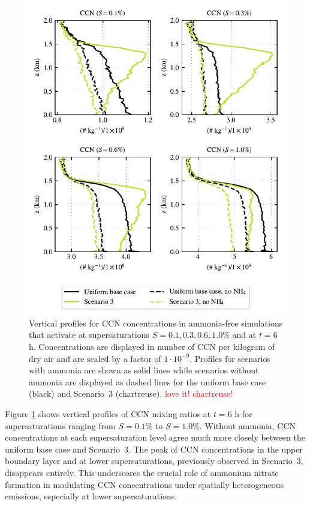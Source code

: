 \documentclass[journal abbreviation, manuscript]{copernicus}
\begin{document}
\begin{figure}[!h]
	\centering
	\includegraphics[]{figures/aerosol-ccn-vertical-profiles-no-nh4-cases-time36.pdf}
	\caption{Vertical profiles for CCN concentrations in
          ammonia-free simulations that activate at supersaturations
          $S=0.1, 0.3, 0.6, 1.0\%$ and at $t=6$ h. Concentrations are
          displayed in number of CCN per kilogram of dry air and are
          scaled by a factor of $1\cdot10^{-9}$. Profiles for
          scenarios with ammonia are shown as solid lines while
          scenarios without ammonia are displayed as dashed lines for
          the uniform base case (black) and Scenario~3
          (chartreuse). \textcolor{red}{love it! chartreuse!}}
	\label{fig:ccn-vertical-profile-no-ammonia}
\end{figure}

Figure \ref{fig:ccn-vertical-profile-no-ammonia} shows vertical
profiles of CCN mixing ratios at $t=6$ h for supersaturations ranging
from $S=0.1\%$ to $S=1.0\%$. Without ammonia, CCN concentrations at
each supersaturation level agree much more closely between the uniform
base case and Scenario~3. The peak of CCN concentrations in the upper
boundary layer and at lower supersaturations, previously observed in
Scenario~3, disappears entirely. This underscores the crucial role of
ammonium nitrate formation in modulating CCN concentrations under
spatially heterogeneous emissions, especially at lower
supersaturations.
\end{document}
